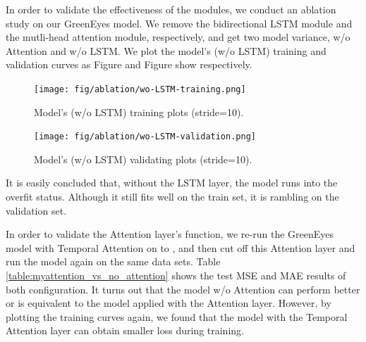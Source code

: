 \documentclass[sigconf]{acmart}
\begin{document}
In order to validate the effectiveness of the modules, we conduct an ablation study on our GreenEyes model. We remove the bidirectional LSTM module and the mutli-head attention module, respectively, and get two model variance, w/o Attention and w/o LSTM. We plot the model's (w/o LSTM) training and validation curves as Figure and Figure show respectively.

\begin{figure}[!htbp]
    \centering
    \texttt{[image: fig/ablation/wo-LSTM-training.png]}
    \caption{Model's (w/o LSTM) training plots (stride=10).}
    \label{fig:wo-LSTM-training}
\end{figure}

\begin{figure}[!htbp]
    \centering
    \texttt{[image: fig/ablation/wo-LSTM-validation.png]}
    \caption{Model's (w/o LSTM) validating plots (stride=10).}
    \label{fig:wo-LSTM-validation}
\end{figure}

It is easily concluded that, without the LSTM layer, the model runs into the overfit status. Although it still fits well on the train set, it is rambling on the validation set.

In order to validate the Attention layer's function, we re-run the GreenEyes model with Temporal Attention on  to , and then cut off this Attention layer and run the model again on the same data sets. Table \ref{table:myattention_vs_no_attention} shows the test MSE and MAE results of both configuration. It turns out that the model w/o Attention can perform better or is equivalent to the model applied with the Attention layer. However, by plotting the training curves again, we found that the model with the Temporal Attention layer can obtain smaller loss during training. 
\end{document}
